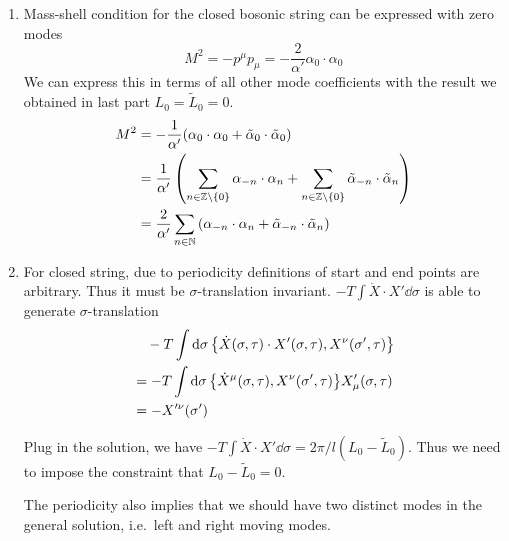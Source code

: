 \begin{enumerate}[label=(\alph*)]
	\item Mass-shell condition for the closed bosonic string can be expressed with zero modes
		\begin{equation}
			M^2 = -p^\mu p_\mu = - \frac{2}{\alpha'} \alpha_0 \cdot \alpha_0
		\end{equation}
		We can express this in terms of all other mode coefficients with the result we obtained in last part $L_0 = \tilde{L}_0 = 0$.
		\begin{align*}
			M^2 &= -\frac{1}{\alpha'} (\alpha_0 \cdot \alpha_0 + \tilde{\alpha}_0 \cdot \tilde{\alpha}_0) \\ 
				 &= \frac{1}{\alpha'} \left( \sum_{n \in \mathbb{Z} \setminus \{0\}} \alpha_{-n} \cdot \alpha_{n} + \sum_{n \in \mathbb{Z} \setminus \{0\}} \tilde\alpha_{-n} \cdot \tilde \alpha_{n} \right) \\
				 &= \frac{2}{\alpha'} \sum_{n\in \mathbb{N}} \left( \alpha_{-n} \cdot \alpha_{n} + \tilde\alpha_{-n} \cdot \tilde \alpha_{n} \right)
		\end{align*}

	\item 
		For closed string, due to periodicity definitions of start and end points are arbitrary. Thus it must be $\sigma$-translation invariant.
		$-T \int \dot{X} \cdot X' \dd{\sigma}$ is able to generate $\sigma$-translation
		\begin{align*}
			&\quad -T \int \dd{\sigma} \acomm{\dot{X}(\sigma, \tau) \cdot X'(\sigma, \tau)}{X^\nu(\sigma',\tau)} \\
			&= -T \int \dd{\sigma} \acomm{\dot{X}^\mu(\sigma, \tau) }{X^\nu(\sigma',\tau)}X'_\mu(\sigma, \tau) \\
			&= - X'^\nu(\sigma')
		\end{align*}
		
		Plug in the solution, we have $-T \int \dot{X} \cdot X' \dd{\sigma} = 2\pi/l (L_0 - \tilde{L}_0)$.
		Thus we need to impose the constraint that $L_0 - \tilde{L}_0 = 0$.

		The periodicity also implies that we should have two distinct modes in the general solution, i.e.~left and right moving modes.
\end{enumerate}
